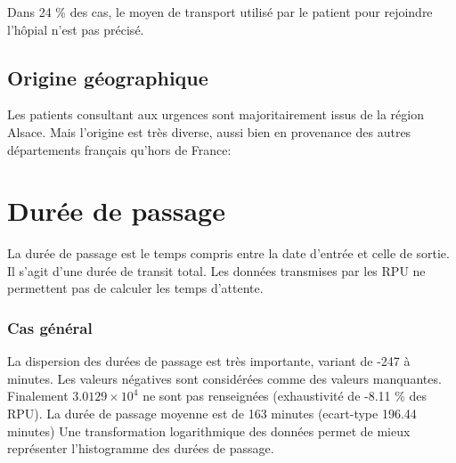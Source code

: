 \documentclass[12pt,english,french,twoside]{report}\usepackage[]{graphicx}\usepackage[]{color}
\begin{document}
Dans 24 \% des cas, le moyen de transport utilisé par le patient pour rejoindre l'hôpial n'est pas précisé.

\section*{Origine géographique}



Les patients consultant aux urgences sont majoritairement issus de la région Alsace. Mais l'origine est très diverse, aussi bien en provenance des autres départements français qu'hors de France:


\newpage
\chapter{Durée de passage}


La durée de passage est le temps compris entre la date d'entrée et celle de sortie. Il s'agit d'une durée de transit total. Les données transmises par les RPU ne permettent pas de calculer les temps d'attente.

\subsection{Cas général}




La dispersion des durées de passage est très importante, variant de -247 à  minutes. Les valeurs négatives sont considérées comme des valeurs manquantes. 
Finalement \ensuremath{3.0129\times 10^{4}} ne sont pas renseignées (exhaustivité de -8.11 \% des RPU). 
La durée de passage moyenne est de 163 minutes (ecart-type 196.44 minutes)
Une transformation logarithmique des données permet de mieux représenter l'histogramme des durées de passage. 
\end{document}
